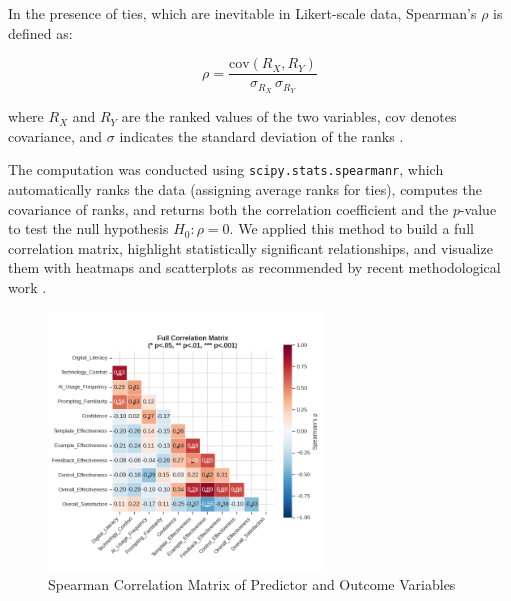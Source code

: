 In the presence of ties, which are inevitable in Likert-scale data, Spearman's $\rho$ is defined as:

\begin{equation}
\rho = \frac{\text{cov}(R_X, R_Y)}{\sigma_{R_X} \, \sigma_{R_Y}}
\end{equation}

where $R_X$ and $R_Y$ are the ranked values of the two variables, $\text{cov}$ denotes covariance, and $\sigma$ indicates the standard deviation of the ranks \cite{upadhyay2021correlation}.

The computation was conducted using \texttt{scipy.stats.spearmanr}, which automatically ranks the data (assigning average ranks for ties), computes the covariance of ranks, and returns both the correlation coefficient and the $p$-value to test the null hypothesis $H_{0}: \rho = 0$. We applied this method to build a full correlation matrix, highlight statistically significant relationships, and visualize them with heatmaps and scatterplots as recommended by recent methodological work \cite{gu2022complex,briganti2024network}.

\begin{figure}[h]
\centering
\includegraphics[width=0.65\textwidth]{figures/09.png}
\caption{Spearman Correlation Matrix of Predictor and Outcome Variables}
\label{fig:correlation_matrix}
\end{figure}

